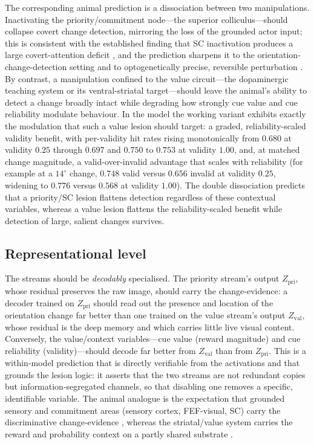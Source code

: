 The corresponding animal prediction is a dissociation between two manipulations. Inactivating the priority/commitment node---the superior colliculus---should collapse covert change detection, mirroring the loss of the grounded actor input; this is consistent with the established finding that SC inactivation produces a large covert-attention deficit \citep{zenon2012attention,lovejoy2010inactivation,bollimunta2018fefsc}, and the prediction sharpens it to the orientation-change-detection setting and to optogenetically precise, reversible perturbation \citep{krauzlis2018selective,katz2025optogenetic}. By contrast, a manipulation confined to the value circuit---the dopaminergic teaching system or its ventral-striatal target---should leave the animal's ability to detect a change broadly intact while degrading how strongly cue value and cue reliability modulate behaviour. In the model the working variant exhibits exactly the modulation that such a value lesion should target: a graded, reliability-scaled validity benefit, with per-validity hit rates rising monotonically from $0.680$ at validity $0.25$ through $0.697$ and $0.750$ to $0.753$ at validity $1.00$, and, at matched change magnitude, a valid-over-invalid advantage that scales with reliability (for example at a $14^{\circ}$ change, $0.748$ valid versus $0.656$ invalid at validity $0.25$, widening to $0.776$ versus $0.568$ at validity $1.00$). The double dissociation predicts that a priority/SC lesion flattens detection regardless of these contextual variables, whereas a value lesion flattens the reliability-scaled benefit while detection of large, salient changes survives.

\subsection{Representational level}

The streams should be \emph{decodably} specialised. The priority stream's output $Z_{\mathrm{pri}}$, whose residual preserves the raw image, should carry the change-evidence: a decoder trained on $Z_{\mathrm{pri}}$ should read out the presence and location of the orientation change far better than one trained on the value stream's output $Z_{\mathrm{val}}$, whose residual is the deep memory and which carries little live visual content. Conversely, the value/context variables---cue value (reward magnitude) and cue reliability (validity)---should decode far better from $Z_{\mathrm{val}}$ than from $Z_{\mathrm{pri}}$. This is a within-model prediction that is directly verifiable from the activations and that grounds the lesion logic: it asserts that the two streams are not redundant copies but information-segregated channels, so that disabling one removes a specific, identifiable variable. The animal analogue is the expectation that grounded sensory and commitment areas (sensory cortex, FEF-visual, SC) carry the discriminative change-evidence \citep{thompson2005neuronal,gold2007neural,katz2016dissociated}, whereas the striatal/value system carries the reward and probability context on a partly shared substrate \citep{platt1999neural,sugrue2004matching}.

